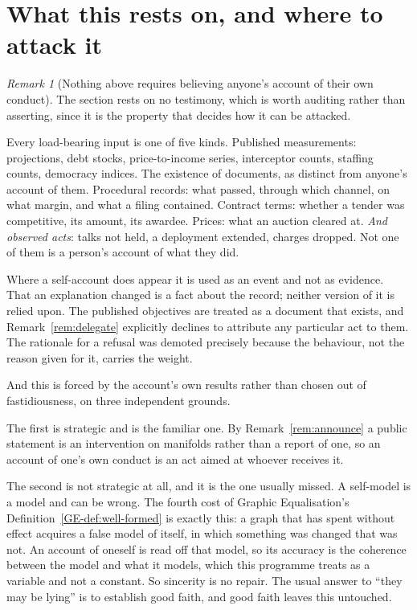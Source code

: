 \documentclass[11pt,a4paper]{article}
\theoremstyle{remark}
\newtheorem{remark}[definition]{Remark}
\begin{document}
\section{What this rests on, and where to attack it}\label{sec:rests}
\begin{remark}[Nothing above requires believing anyone's account of their own conduct]\label{rem:testimony}
The section rests on no testimony, which is worth auditing rather than asserting, since it is the
property that decides how it can be attacked.

Every load-bearing input is one of five kinds. Published measurements: projections, debt stocks,
price-to-income series, interceptor counts, staffing counts, democracy indices. The existence of
documents, as distinct from anyone's account of them. Procedural records: what passed, through which
channel, on what margin, and what a filing contained. Contract terms: whether a tender was competitive,
its amount, its awardee. Prices: what an auction cleared at. \emph{And observed acts}: talks not held, a
deployment extended, charges dropped. Not one of them is a person's account of what they did.

Where a self-account does appear it is used as an event and not as evidence. That an explanation
changed is a fact about the record; neither version of it is relied upon. The published objectives are
treated as a document that exists, and Remark~\ref{rem:delegate} explicitly declines to attribute any
particular act to them. The rationale for a refusal was demoted precisely because the behaviour, not the
reason given for it, carries the weight.

And this is forced by the account's own results rather than chosen out of fastidiousness, on
three independent grounds.

The first is strategic and is the familiar one. By Remark~\ref{rem:announce} a public statement is
an intervention on manifolds rather than a report of one, so an account of one's own conduct is an act
aimed at whoever receives it.

The second is not strategic at all, and it is the one usually missed. A self-model is a
model and can be wrong. The fourth cost of Graphic Equalisation's Definition~\ref{GE-def:well-formed} is exactly this: a graph that has spent
without effect acquires a false model of itself, in which something was changed that was not. An
account of oneself is read off that model, so its accuracy is the coherence between the model and what
it models, which this programme treats as a variable and not a constant. So sincerity is no
repair. The usual answer to ``they may be lying'' is to establish good faith, and good faith leaves this
untouched.


\end{remark}
\end{document}
